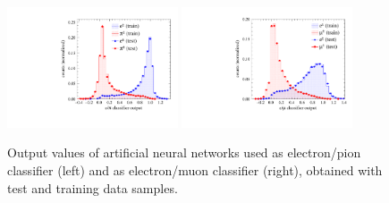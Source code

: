 \begin{figure}[h!]
  \centering
  \includegraphics[width=0.45\textwidth]{Chapter7_analysis_kloe/img/csps/epi_output}
  \hspace{1em}  
  \includegraphics[width=0.45\textwidth]{Chapter7_analysis_kloe/img/csps/emu_output}
  \caption{Output values of artificial neural networks used as electron/pion classifier (left) and as electron/muon classifier (right), obtained with test and training data samples. }\label{fig:mlp_outputs}
\end{figure}

